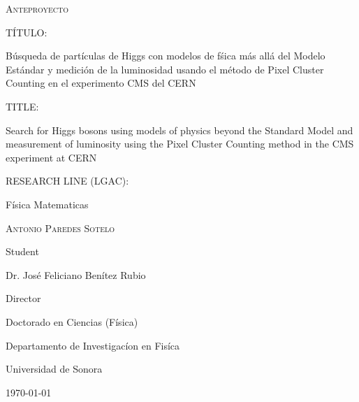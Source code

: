 \documentclass[final,3p]{CSP}
\def\Student{Antonio Paredes Sotelo}
\def\Title{Anteproyecto}
\def\Prog{Doctorado en Ciencias (F\'{i}sica) }
\def\Dept{Departamento de Investigac\'{i}on en Fis\'{i}ca}
\def\Director{Dr. Jos\'{e} Feliciano Ben\'{i}tez Rubio}
\def\ProjectTitle{B\'usqueda de part\'iculas de Higgs con modelos de f\'sica m\'as all\'a del Modelo Est\'andar y medici\'on de la luminosidad usando el m\'etodo de Pixel Cluster Counting en el experimento CMS del CERN}
\def\ProjectTitleEnglish{Search for Higgs bosons using models of physics beyond the Standard Model and measurement of luminosity using the Pixel Cluster Counting method in the CMS experiment at CERN}
\def\ResearchLine{F\'{i}sica Matematicas}
\begin{document}
\begin{titlepage}
  \centering
  \hspace{0pt}
  \vfill
        {\scshape\Large \Title \par}

	\vspace{1cm}
        \begin{adjustwidth}{2cm}{2cm}{
            T\'ITULO:\par
            {\large \ProjectTitle \par}
          }
          \end{adjustwidth}

        \vspace{0.5cm}
        \begin{adjustwidth}{2cm}{2cm}{
            TITLE:\par
            {\large \ProjectTitleEnglish \par}
          }
          \end{adjustwidth}
          
	\vspace{0.5cm}
        \begin{adjustwidth}{2cm}{2cm}{
            RESEARCH LINE (LGAC):  \par
            \ResearchLine \par}
        \end{adjustwidth}

        
        \vspace{4cm}
        {\underline{\hspace{8cm}}\par}
	{\scshape\large \Student \par}
        {Student\par}

        \vspace{1cm}
        {\underline{\hspace{8cm}}\par}
	{\Director \par}
        {Director\par}

        \vspace{1cm}
        {\Prog \par}
        {\Dept \par}
        {Universidad de Sonora \par}

        \vspace{4cm}
	{\today}

\hspace{0pt}
\vfill

\end{titlepage}
\end{document}
